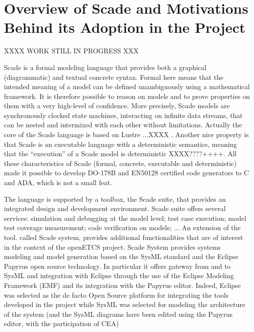 \documentclass{template/openetcs_report}
\begin{document}

\section{Overview of Scade and Motivations Behind its Adoption in the
  Project}

XXXX WORK STILL IN PROGRESS XXX


Scade is a formal modeling language that provides both a graphical
(diagrammatic) and textual concrete syntax. Formal here means that the
intended meaning of a model can be defined unambiguously using a
mathematical framework. It is therefore possible to reason on models
and to prove properties on them with a very high-level of
confidence. More precisely, Scade models are synchronously clocked
state machines, interacting on infinite data streams, that can be
nested and intermixed with each other without limitations. Actually
the core of the Scade language is based on Lustre ...XXXX . Another
nice property is that Scade is an executable language with a
deterministic semantics, meaning that the ``execution'' of a Scade
model is deterministic XXXX????++++.  All these characteristics of
Scade (formal, concrete, executable and deterministic) made it
possible to develop DO-178B and EN50128 certified code generators to C
and ADA, which is not a small feat.

The language is supported by a toolbox, the Scade suite, that provides
an integrated design and development environment. Scade suite offers
several services: simulation and debugging at the model level; test
case execution; model test coverage measurement; code verification on
models; ... An extension of the tool. called Scade system, provides
additional functionalities that are of interest in the context of the
openETCS project.  Scade System provides systems modeling and model
generation based on the SysML standard and the Eclipse Papyrus open
source technology. In particular it offers gateway from and to SysML
and integration with Eclipse through the use of the Eclipse Modeling
Framework (EMF) and its integration with the Papyrus editor. Indeed,
Eclipse was selected as the de facto Open Source platform for
integrating the tools developed in the project while SysML was
selected for modeling the architecture of the system (and the SysML
diagrams have been edited using the Papyrus editor, with the
participation of CEA)
\end{document}
